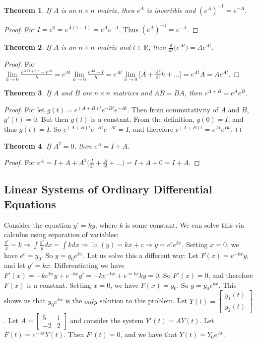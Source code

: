 \documentclass[oneside]{book}
\newtheorem{theorem}{Theorem}[section]
\theoremstyle{definition}
\begin{document}
\begin{theorem}
If $A$ is an $n\times n$ matrix, then $e^A$ is invertible and $(e^A)^{-1} = e^{-A}$.
\end{theorem}
\begin{proof}
For $I = e^{0} = e^{A(1-1)} = e^Ae^{-A}$. Thus $(e^{A})^{-1} = e^{-A}$.
\end{proof}

\begin{theorem}
If $A$ is an $n\times n$ matrix and $t\in \mathbb{R}$, then $\frac{d}{dt}\big(e^{At}\big) = Ae^{At}$.
\end{theorem}
\begin{proof}
For $\underset{h\rightarrow 0}\lim \frac{e^{A(t+h)}-e^{At}}{h} = e^{At}\underset{h\rightarrow 0}\lim \frac{e^{Ah}-I}{h} = e^{At}\underset{h\rightarrow 0}\lim\big[A+\frac{A^2}{2!}h+\hdots\big] = e^{At}A = Ae^{At}$.
\end{proof}

\begin{theorem}
If $A$ and $B$ are $n\times n$ matrices and $AB=BA$, then $e^{A+B} = e^Ae^B$.
\end{theorem}
\begin{proof}
For let $g(t) = e^{(A+B)t}e^{-Bt}e^{-At}$. Then from commutativity of $A$ and $B$, $g'(t) = 0$. But then $g(t)$ is a constant. From the definition, $g(0) = I$, and thus $g(t) = I$. So $e^{(A+B)t}e^{-Bt}e^{-At} = I$, and therefore $e^{(A+B)t} = e^{At}e^{Bt}$.
\end{proof}

\begin{theorem}
If $A^2 = 0$, then $e^A = I+A$.
\end{theorem}
\begin{proof}
For $e^A = I+A+A^2\big(\frac{I}{2!}+\frac{A}{3!}+\hdots\big) = I+A+0 = I+A$.
\end{proof}

\subsection{Linear Systems of Ordinary Differential Equations}

Consider the equation $y' = ky$, where $k$ is some constant. We can solve this via calculus using separation of variables: $\frac{y'}{y} = k\Rightarrow \int \frac{y'}{y}dx = \int kdx \Rightarrow \ln(y) = kx+c \Rightarrow y = e^c e^{kx}$. Setting $x=0$, we have $e^c = y_0$. So $y = y_0e^{kx}$. Let us solve this a different way: Let $F(x) = e^{-kx}y$, and let $y'=kx$. Differentiating we have $F'(x) = -ke^{kx}y + e^{-kx}y' = -ke^{-kx}+e^{=kx}ky = 0$. So $F'(x) = 0$, and therefore $F(x)$ is a constant. Setting $x=0$, we have $F(x) = y_0$. So $y = y_0e^{kx}$. This shows us that $y_0e^{kx}$ is the $only$ solution to this problem. Let $Y(t) = \begin{bmatrix} y_1(t) \\ y_2(t)\end{bmatrix}$. Let $A=\begin{bmatrix} 5 & 1 \\ -2 & 2 \end{bmatrix}$ and consider the system $Y'(t) = AY(t)$. Let $F(t) = e^{-At}Y(t)$. Then $F'(t) = 0$, and we have that $Y(t) = Y_0 e^{At}$.
\end{document}
